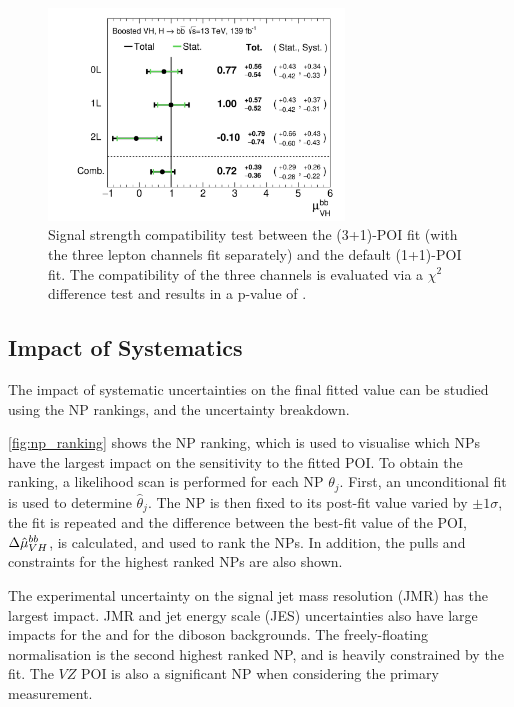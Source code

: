 \begin{figure}[!htbp]
  \centering
  \includegraphics[width=0.7\textwidth]{chapters/6.vhbb_boosted/figs/Plot_mu_102_VH.pdf}
  \caption{
    Signal strength compatibility test between the (3+1)-POI fit (with the three lepton channels fit separately) and the default (1+1)-POI fit.
    The compatibility of the three channels is evaluated via a $\chi^2$ difference test and results in a p-value of  \cite{HIGG-2018-52}.
  }
  \label{fig:channel_comp}
\end{figure}



\subsection{Impact of Systematics}\label{sec:sys_results}

The impact of systematic uncertainties on the final fitted value \muhatbb can be studied using the NP rankings, and the uncertainty breakdown.

\cref{fig:np_ranking} shows the NP ranking, which is used to visualise which NPs have the largest impact on the sensitivity to the fitted POI.
To obtain the ranking, a likelihood scan is performed for each NP $\theta_j$.
First, an unconditional fit is used to determine $\hat{\theta}_j$.
The NP is then fixed to its post-fit value varied by $\pm 1 \sigma$, the fit is repeated and the difference between the best-fit value of the POI, $\Delta \hat{\mu}_{VH}^{bb}$, is calculated, and used to rank the NPs.
In addition, the pulls and constraints for the highest ranked NPs are also shown.

The experimental uncertainty on the signal \largeR jet mass resolution (JMR) has the largest impact.
JMR and jet energy scale (JES) uncertainties also have large impacts for the \Vjets and for the diboson backgrounds.
The freely-floating \Zhf normalisation is the second highest ranked NP, and is heavily constrained by the fit.
The $VZ$ POI \muVZ is also a significant NP when considering the primary \muVH measurement.

